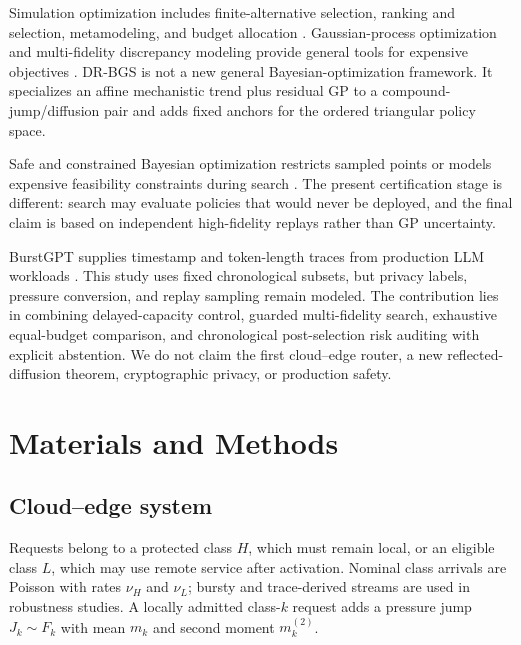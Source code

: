 \documentclass[futureinternet,article,submit,moreauthors]{Definitions/mdpi}
\begin{document}
Simulation optimization includes finite-alternative selection, ranking and selection, metamodeling, and budget allocation \cite{amaran2016review,boesel2003cleanup,chick2001crn,chen2008subset}. Gaussian-process optimization and multi-fidelity discrepancy modeling provide general tools for expensive objectives \cite{jones1998ego,snoek2012bo,kennedy2000multifidelity,mikkola2023rmfbo,fan2024imfbo}. DR-BGS is not a new general Bayesian-optimization framework. It specializes an affine mechanistic trend plus residual GP to a compound-jump/diffusion pair and adds fixed anchors for the ordered triangular policy space.

Safe and constrained Bayesian optimization restricts sampled points or models expensive feasibility constraints during search \cite{gardner2014constrained,sui2015safeopt,lubsen2024safemultitask}. The present certification stage is different: search may evaluate policies that would never be deployed, and the final claim is based on independent high-fidelity replays rather than GP uncertainty.

BurstGPT supplies timestamp and token-length traces from production LLM workloads \cite{burstgpt2025}. This study uses fixed chronological subsets, but privacy labels, pressure conversion, and replay sampling remain modeled. The contribution lies in combining delayed-capacity control, guarded multi-fidelity search, exhaustive equal-budget comparison, and chronological post-selection risk auditing with explicit abstention. We do not claim the first cloud--edge router, a new reflected-diffusion theorem, cryptographic privacy, or production safety.

\section{Materials and Methods}
\label{sec:methods}

\subsection{Cloud--edge system}

Requests belong to a protected class $H$, which must remain local, or an eligible class $L$, which may use remote service after activation. Nominal class arrivals are Poisson with rates $\nu_H$ and $\nu_L$; bursty and trace-derived streams are used in robustness studies. A locally admitted class-$k$ request adds a pressure jump $J_k\sim F_k$ with mean $m_k$ and second moment $m_k^{(2)}$.
\end{document}
